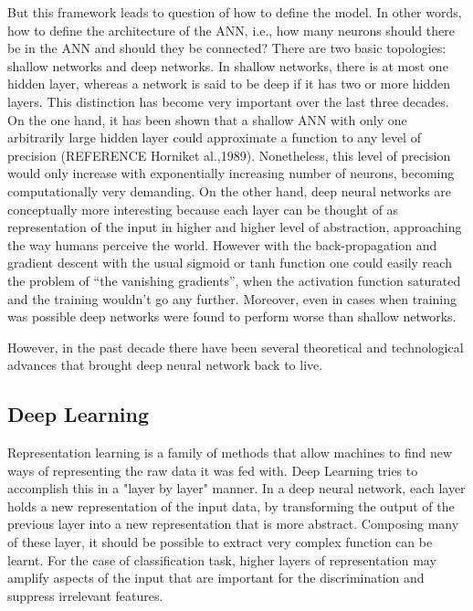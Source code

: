 \documentclass{article}
\begin{document}
But this framework leads to question of how to define the model. In other words, how to define the architecture of the ANN, i.e., how many neurons should there be in the ANN and should they be connected? There are two basic topologies: shallow networks and deep networks. In shallow networks, there is at most one hidden layer, whereas a network is said to be deep if it has two or more hidden layers. This distinction has become very important over the last three decades. On the one hand, it has been shown that a shallow ANN with only one arbitrarily large hidden layer could approximate a function to any level of precision (REFERENCE Horniket al.,1989). Nonetheless, this level of precision would only increase with exponentially increasing number of neurons, becoming computationally very demanding. On the other hand, deep neural networks are conceptually more interesting because each layer can be thought of as representation of the input in higher and higher level of abstraction, approaching the way humans perceive the world. However with the back-propagation and gradient descent with the usual sigmoid or tanh function one could easily reach the problem of “the vanishing gradients”, when the activation function saturated and the training wouldn't go any further. Moreover, even in cases when training was possible deep networks were found to perform worse than shallow networks.

However, in the past decade there have been several theoretical and technological advances that brought deep neural network back to live.

\subsection{Deep Learning}
\label{subsec:Deep-Learning}
Representation learning is a family of methods that allow machines to find new ways of representing the raw data it was fed with. Deep Learning tries to accomplish this in a "layer by layer" manner. In a deep neural network, each layer holds a new representation of the input data, by transforming the output of the previous layer into a new representation that is more abstract. Composing many of these layer, it should be possible to extract very complex function can be learnt. For the case of classification task, higher layers of representation may amplify aspects of the input that are important for the discrimination and suppress irrelevant features.
\end{document}
